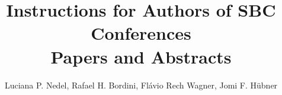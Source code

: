\title{Instructions for Authors of SBC Conferences\\ Papers and Abstracts}

\author{Luciana P. Nedel, Rafael H. Bordini, Flávio Rech
	Wagner, Jomi F. Hübner }


\address{Instituto de Informática -- Universidade Federal do Rio Grande do Sul
	(UFRGS)\\
	Caixa Postal 15.064 -- 91.501-970 -- Porto Alegre -- RS -- Brazil
	\nextinstitute
	Department of Computer Science -- University of Durham\\
	Durham, U.K.
	\nextinstitute
	Departamento de Sistemas e Computação\\
	Universidade Regional de Blumenal (FURB) -- Blumenau, SC -- Brazil
}
